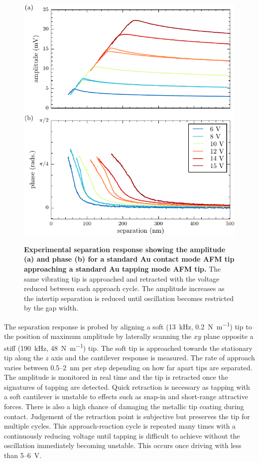 \documentclass{article}
\begin{document}
\begin{figure}[bt]
\centering
{\includegraphics{figures/exp_separation_response}}
{\caption[Experimental separation response showing the amplitude (a) and phase (b) for a standard Au contact mode AFM tip approaching a standard Au tapping mode AFM tip]{\textbf{Experimental separation response showing the amplitude (a) and phase (b) for a standard Au contact mode AFM tip approaching a standard Au tapping mode AFM tip.} The same vibrating tip is approached and retracted with the voltage reduced between each approach cycle. The amplitude increases as the intertip separation is reduced until oscillation becomes restricted by the gap width.}
\label{fig:exp_sep_resp}}
\end{figure}

The separation response is probed by aligning a soft (\SI{13}{kHz}, \SI{0.2}{\newton\per\metre}) tip to the position of maximum amplitude by laterally scanning the $xy$ plane opposite a stiff (\SI{190}{kHz}, \SI{48}{\newton\per\metre}) tip. The soft tip is approached towards the stationary tip along the $z$ axis and the cantilever response is measured. The rate of approach varies between 0.5--\SI{2}{nm} per step depending on how far apart tips are separated. The amplitude is monitored in real time and the tip is retracted once the signatures of tapping are detected. Quick retraction is necessary as tapping with a soft cantilever is unstable to effects such as snap-in and short-range attractive forces. There is also a high chance of damaging the metallic tip coating during contact. Judgement of the retraction point is subjective but preserves the tip for multiple cycles. This approach-reaction cycle is repeated many times with a continuously reducing voltage until tapping is difficult to achieve without the oscillation immediately becoming unstable. This occurs once driving with less than 5--\SI{6}{V}.
\end{document}
